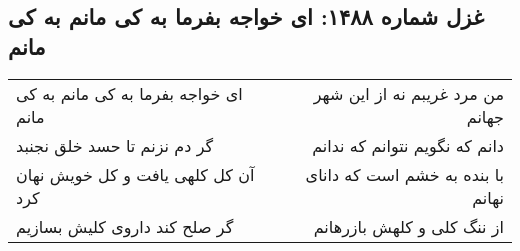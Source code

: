 \begin{center}
\section*{غزل شماره ۱۴۸۸: ای خواجه بفرما به کی مانم به کی مانم}
\label{sec:1488}
\begin{longtable}{l p{0.5cm} r}
ای خواجه بفرما به کی مانم به کی مانم
&&
من مرد غریبم نه از این شهر جهانم
\\
گر دم نزنم تا حسد خلق نجنبد
&&
دانم که نگویم نتوانم که ندانم
\\
آن کل کلهی یافت و کل خویش نهان کرد
&&
با بنده به خشم است که دانای نهانم
\\
گر صلح کند داروی کلیش بسازیم
&&
از ننگ کلی و کلهش بازرهانم
\\
\end{longtable}
\end{center}
